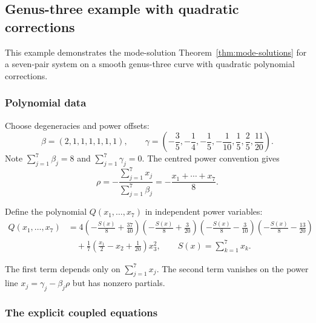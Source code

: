 \documentclass[11pt]{article}
\begin{document}
\subsection{Genus-three example with quadratic corrections}

This example demonstrates the mode-solution Theorem~\ref{thm:mode-solutions}
for a seven-pair system on a smooth genus-three curve with quadratic
polynomial corrections.

\subsubsection{Polynomial data}

Choose degeneracies and power offsets:
\begin{equation}\label{ex:g3-data}
\beta = (2,1,1,1,1,1,1), \qquad \gamma = \left(-\frac{3}{5},-\frac{1}{4},-\frac{1}{5},-\frac{1}{10},\frac{1}{5},\frac{2}{5},\frac{11}{20}\right).
\end{equation}
Note $\sum_{j=1}^{7}\beta_j = 8$ and $\sum_{j=1}^{7}\gamma_j = 0$. The centred power convention gives
\[
\rho = -\frac{\sum_{j=1}^7 x_j}{\sum_{j=1}^{7}\beta_j} = -\frac{x_1+\cdots+x_7}{8}.
\]

Define the polynomial $Q(x_1,\ldots,x_7)$ in independent power variables:
\begin{equation}\label{ex:g3-Q}
\begin{aligned}
Q(x_1,\ldots,x_7)&=4\left(-\frac{S(x)}8+\frac{37}{40}\right)\left(-\frac{S(x)}8+\frac3{20}\right)
\left(-\frac{S(x)}8-\frac3{10}\right)\left(-\frac{S(x)}8-\frac{13}{20}\right)\\
&\quad+\frac17\left(\frac{x_1}{2}-x_2+\frac1{20}\right)x_3^2,
\qquad S(x)=\sum_{k=1}^{7}x_k.
\end{aligned}
\end{equation}

The first term depends only on $\sum_{j=1}^{7} x_j$. The second term vanishes on the power line $x_j = \gamma_j - \beta_j\rho$ but has nonzero partials.

\subsubsection{The explicit coupled equations}
\end{document}
